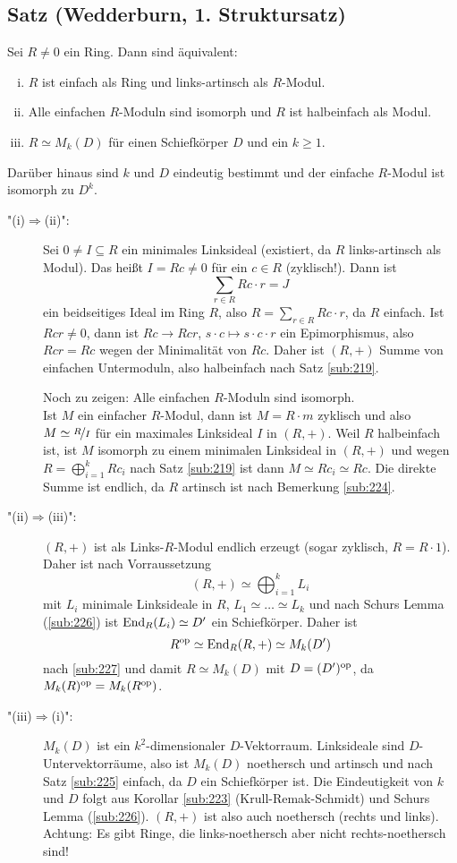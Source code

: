 \subsection{Satz (Wedderburn, 1. Struktursatz)} %
\label{sub:229}
Sei $R \not= 0$ ein Ring. Dann sind äquivalent:
\begin{enumerate}[(i)]
	\item $R$ ist einfach als Ring und links-artinsch als $R$-Modul.
	\item Alle einfachen $R$-Moduln sind isomorph und $R$ ist halbeinfach als Modul. 
	\item $R \simeq M_k(D)$ für einen Schiefkörper $D$ und ein $k\ge 1$. 
\end{enumerate}
Darüber hinaus sind $k$ und $D$ eindeutig bestimmt und der einfache $R$-Modul ist isomorph zu $D^k$.
\begin{description}
	\item["(i)$\Rightarrow $(ii)":] Sei $0  \not= I \subseteq R$ ein minimales Linksideal (existiert, da $R$ links-artinsch als Modul). Das heißt $I = R c \not= 0$ für ein
	$c \in R$ (zyklisch!). Dann ist 
	\[
		\sum_{r \in R} R c \cdot r = J
	\] 
	ein beidseitiges Ideal im Ring $R$, also $R= \sum_{r\in R} Rc\cdot r$, da $R$ einfach. Ist $Rc r \not= 0$, dann ist $R c \to R c r$, $s\cdot c\mapsto s \cdot c\cdot r$
	ein Epimorphismus, also $R c r = R c$ wegen der Minimalität von $R c$. Daher ist $(R,+)$ Summe von einfachen Untermoduln, also halbeinfach nach Satz \ref{sub:219}.
	
	Noch zu zeigen: Alle einfachen $R$-Moduln sind isomorph. \\
	Ist $M$ ein einfacher $R$-Modul, dann ist $M = R \cdot m$ zyklisch und also $M \simeq \nicefrac{R}{I}$ für ein maximales Linksideal
	$I$ in $(R,+)$. Weil $R$ halbeinfach
	ist, ist $M$ isomorph zu einem minimalen Linksideal in $(R,+)$ und wegen $R = \bigoplus_{i=1}^k R c_i$ nach Satz \ref{sub:219} ist dann $M \simeq R c_i \simeq Rc$. Die 
	direkte Summe ist endlich, da $R$ artinsch ist nach Bemerkung \ref{sub:224}.
	\item["(ii)$\Rightarrow $(iii)":]  $(R,+)$ ist als Links-$R$-Modul endlich erzeugt (sogar zyklisch, $R= R \cdot 1$). Daher ist nach Vorraussetzung 
	\[
		(R,+) \simeq \bigoplus_{i=1}^k L_i
	\]
	mit $L_i$ minimale Linksideale in $R$, $L_1 \simeq \ldots  \simeq L_k$ und nach Schurs Lemma (\ref{sub:226}) ist $\operatorname{End}_R(L_i) \simeq D'$ ein Schiefkörper. Daher ist
	\[
		R^{\mathrm{op}} \simeq \operatorname{End}_R(R,+) \simeq M_k(D')
	\]
	nach \ref{sub:227} und damit $R \simeq M_k(D)$ mit $D= (D')^{\mathrm{op}}$, da $M_k(R)^{\mathrm{op}} = M_k(R^{\mathrm{op}})$.
	\item["(iii)$\Rightarrow$(i)":] $M_k(D)$ ist ein $k^2$-dimensionaler $D$-Vektorraum. Linksideale sind $D$-Untervektorräume, also ist $M_k(D)$ noethersch und artinsch
	und nach Satz \ref{sub:225} einfach, da $D$ ein Schiefkörper ist. 
	Die Eindeutigkeit von $k$ und $D$ folgt aus Korollar \ref{sub:223} (Krull-Remak-Schmidt) und Schurs Lemma (\ref{sub:226}). 
	\bewende
	$(R,+)$ ist also auch noethersch (rechts und links). Achtung: Es gibt Ringe, die links-noethersch aber nicht rechts-noethersch sind!
\end{description}
